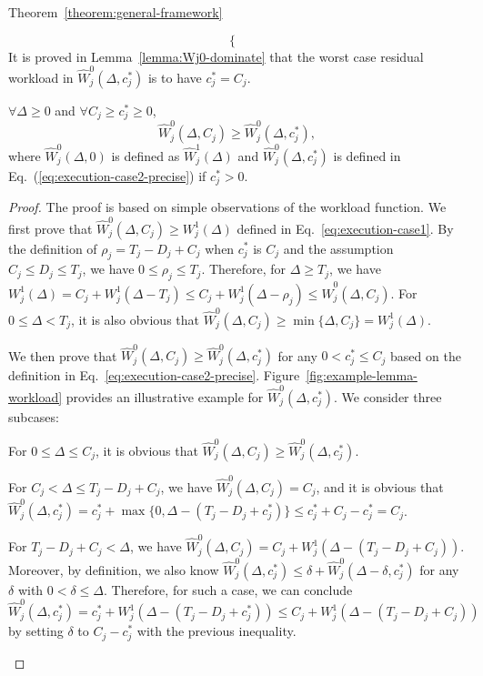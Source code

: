\begin{appProof}{Theorem~\ref{theorem:general-framework}}
\begin{itemize}
\begin{equation}
\begin{cases}
  \end{cases}
\end{equation}
It is proved in Lemma~\ref{lemma:Wj0-dominate} that the worst case
residual workload in $\widehat{W}_j^0(\Delta, c_j^*)$ is to have
$c_j^* = C_j$.
\end{itemize}
\begin{Lemma}
\label{lemma:Wj0-dominate}
$\forall \Delta \geq 0$ and $\forall C_j\geq c_j^* \geq 0$,
\[
\widehat{W}_j^0(\Delta, C_j)  \geq \widehat{W}_j^0(\Delta, c_j^*),
\]
where $\widehat{W}_j^0(\Delta, 0)$ is defined as $\widehat{W}_j^1(\Delta)$  and
$\widehat{W}_j^0(\Delta, c_j^*)$ is defined in Eq.~(\ref{eq:execution-case2-precise}) if $c_j^* > 0$.
\end{Lemma}
\begin{proof}
 The proof is based on simple observations of the workload function. 
 We first prove that $\widehat{W}_j^0(\Delta, C_j) \geq
 W_j^1(\Delta)$ defined in Eq.~\eqref{eq:execution-case1}.  By the definition of $\rho_j=T_j-D_j+C_j$ when $c_j^*$ is $C_j$ and the
 assumption $C_j \leq D_j \leq T_j$, we have $0 \leq \rho_j \leq
 T_j$. Therefore, for $\Delta \geq T_j$, we have $W_j^1(\Delta) = C_j
 + W_j^1(\Delta-T_j) \leq C_j + W_j^1(\Delta - \rho_j) \leq
 \widehat{W}_j^0(\Delta, C_j)$. For $0 \leq \Delta < T_j$, it is also
 obvious that $\widehat{W}_j^0(\Delta, C_j) \geq \min\{\Delta, C_j\}
 = W_j^1(\Delta)$.

 We then prove that $\widehat{W}_j^0(\Delta, C_j) \geq
 \widehat{W}_j^0(\Delta, c_j^*)$ for any $0 < c_j^* \leq C_j$ based on the definition in Eq.~\eqref{eq:execution-case2-precise}. Figure~\ref{fig:example-lemma-workload} provides an illustrative example for $\widehat{W}_j^0(\Delta, c_j^*)$. We consider three subcases:
 \begin{compactitem}
 \item For $0 \leq \Delta \leq C_j$, it is obvious that
   $\widehat{W}_j^0(\Delta, C_j) \geq \widehat{W}_j^0(\Delta,
   c_j^*)$.
 \item For $C_j < \Delta \leq T_j-D_j+C_j$, we have
   $\widehat{W}_j^0(\Delta, C_j) = C_j$, and it is obvious that
   $\widehat{W}_j^0(\Delta, c_j^*) = c_j^* + \max\{0,
   \Delta-(T_j-D_j+c_j^*)\} \leq c_j^* + C_j - c_j^* = C_j$.

 \item For $T_j-D_j+C_j < \Delta$, we have $\widehat{W}_j^0(\Delta,
   C_j) = C_j + W_j^1(\Delta - (T_j-D_j+C_j))$.  Moreover, by
   definition, we also know $\widehat{W}_j^0(\Delta, c_j^*) \leq
   \delta+\widehat{W}_j^0(\Delta-\delta, c_j^*)$ for any $\delta$ with $0 < \delta \leq
   \Delta$. Therefore, for such a case, we can conclude
   $\widehat{W}_j^0(\Delta, c_j^*) = c_j^* + W_j^1(\Delta -
   (T_j-D_j+c_j^*)) \leq C_j + W_j^1(\Delta - (T_j-D_j+C_j))$ by
   setting $\delta$ to $C_j - c_j^*$ with the previous inequality.
 \end{compactitem}
\end{proof}



\end{appProof}
